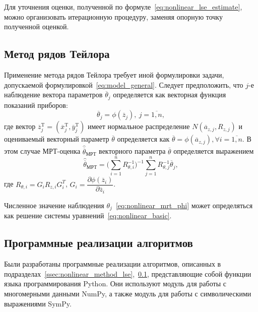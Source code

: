 Для уточнения оценки, полученной по формуле~\eqref{eq:nonlinear_lse_estimate}, можно
организовать итерационную процедуру, заменяя опорную точку полученной оценкой.

\subsection{Метод рядов Тейлора}\label{ssec:nonlinear_method_mrt}

Применение метода рядов Тейлора требует иной формулировки задачи,
допускаемой формулировкой~\eqref{eq:model_general}.
Следует предположить, что \( j \)-е наблюдение вектора параметров \( \overline{\theta}_j \)
определяется как векторная функция показаний приборов:
\begin{equation}
  \label{eq:nonlinear_mrt_phi}
  \overline{\theta}_j = \phi( \overline{z}_{j} ), \: j = \overline{1, n},
\end{equation}
где вектор
\( \overline{z}^{\text{T}}_{j} =
( \overline{x}^{\text{T}}_{j}, \overline{y}^{\text{T}}_{j}) \)
имеет нормальное распределение \( N(\overline{a}_{z,j}, R_{z,j}) \)
и оцениваемый векторный параметр \( \overline{\theta} \) определяется как
\( \overline{\theta} = \phi(\overline{a}_{z,j}), \forall i = \overline{1, n} \).
В этом случае МРТ-оценка \( \hat{\overline{\theta}}_{\text{МРТ}} \) векторного параметра \( \overline{\theta} \)
определяется выражением
\begin{equation*}
  \hat{\overline{\theta}}_{\text{МРТ}} =
  \Bigg( \sum^{n}_{i=1} R^{-1}_{\theta,i} \Bigg)^{-1}
  \sum^{n}_{j=1} R^{-1}_{\theta,j} \overline{\theta}_j,
\end{equation*}
где
\( R_{\theta,i} = G_i R_{z,i} G^T_i \),
\( G_i =
\dfrac{\partial \phi( \overline{z}_{i} ) }{ \partial \overline{z}_{i} } \).

Численное значение наблюдения \( \theta_j \)~\eqref{eq:nonlinear_mrt_phi} может определяться как
решение системы уравнений~\eqref{eq:nonlinear_basic}.

\subsection{Программные реализации алгоритмов}

Были разработаны программные реализации алгоритмов, описанных в
подразделах~\ref{ssec:nonlinear_method_lse},~\ref{ssec:nonlinear_method_mrt},
представляющие собой функции языка программирования Python.
Они используют модуль для работы с многомерными данными NumPy,
а также модуль для работы с символическими выражениями SymPy.

